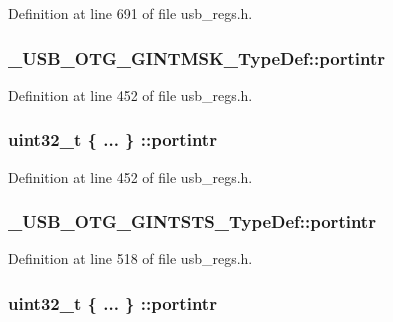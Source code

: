 Definition at line 691 of file usb\-\_\-regs.\-h.

\hypertarget{group___u_s_b___o_t_g___d_r_i_v_e_r_ga99e136933a390151d3db44096e15cfe0}{
\subsubsection[{portintr}]{ \-\_\-\-U\-S\-B\-\_\-\-O\-T\-G\-\_\-\-G\-I\-N\-T\-M\-S\-K\-\_\-\-Type\-Def\-::portintr}}\label{group___u_s_b___o_t_g___d_r_i_v_e_r_ga99e136933a390151d3db44096e15cfe0}


Definition at line 452 of file usb\-\_\-regs.\-h.

\hypertarget{group___u_s_b___o_t_g___d_r_i_v_e_r_ga4c25019ccb51d043732d003b9d74b446}{
\subsubsection[{portintr}]{\setlength{\rightskip}{0pt plus 5cm}uint32\-\_\-t \{ ... \} \-::portintr}}\label{group___u_s_b___o_t_g___d_r_i_v_e_r_ga4c25019ccb51d043732d003b9d74b446}


Definition at line 452 of file usb\-\_\-regs.\-h.

\hypertarget{group___u_s_b___o_t_g___d_r_i_v_e_r_ga892d7ace179d025cd937a411eca950d3}{
\subsubsection[{portintr}]{ \-\_\-\-U\-S\-B\-\_\-\-O\-T\-G\-\_\-\-G\-I\-N\-T\-S\-T\-S\-\_\-\-Type\-Def\-::portintr}}\label{group___u_s_b___o_t_g___d_r_i_v_e_r_ga892d7ace179d025cd937a411eca950d3}


Definition at line 518 of file usb\-\_\-regs.\-h.

\hypertarget{group___u_s_b___o_t_g___d_r_i_v_e_r_ga8adf55f159076be315d06bea6be29728}{
\subsubsection[{portintr}]{\setlength{\rightskip}{0pt plus 5cm}uint32\-\_\-t \{ ... \} \-::portintr}}\label{group___u_s_b___o_t_g___d_r_i_v_e_r_ga8adf55f159076be315d06bea6be29728}


